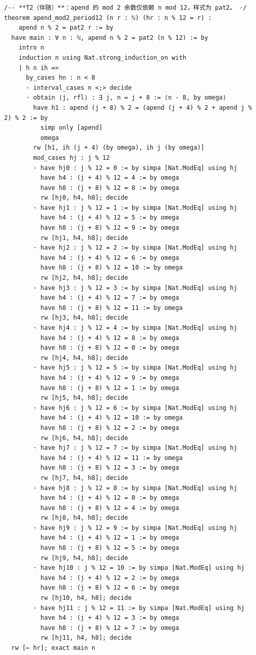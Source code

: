 \documentclass[11pt]{article}
\theoremstyle{definition}
\begin{document}
\begin{lstlisting}
/-- **T2（伴随）**：apend 的 mod 2 余数仅依赖 n mod 12，样式为 pat2。 -/
theorem apend_mod2_period12 (n r : ℕ) (hr : n % 12 = r) :
    apend n % 2 = pat2 r := by
  have main : ∀ n : ℕ, apend n % 2 = pat2 (n % 12) := by
    intro n
    induction n using Nat.strong_induction_on with
    | h n ih =>
      by_cases hn : n < 8
      · interval_cases n <;> decide
      · obtain ⟨j, rfl⟩ : ∃ j, n = j + 8 := ⟨n - 8, by omega⟩
        have h1 : apend (j + 8) % 2 = (apend (j + 4) % 2 + apend j % 2) % 2 := by
          simp only [apend]
          omega
        rw [h1, ih (j + 4) (by omega), ih j (by omega)]
        mod_cases hj : j % 12
        · have hj0 : j % 12 = 0 := by simpa [Nat.ModEq] using hj
          have h4 : (j + 4) % 12 = 4 := by omega
          have h8 : (j + 8) % 12 = 8 := by omega
          rw [hj0, h4, h8]; decide
        · have hj1 : j % 12 = 1 := by simpa [Nat.ModEq] using hj
          have h4 : (j + 4) % 12 = 5 := by omega
          have h8 : (j + 8) % 12 = 9 := by omega
          rw [hj1, h4, h8]; decide
        · have hj2 : j % 12 = 2 := by simpa [Nat.ModEq] using hj
          have h4 : (j + 4) % 12 = 6 := by omega
          have h8 : (j + 8) % 12 = 10 := by omega
          rw [hj2, h4, h8]; decide
        · have hj3 : j % 12 = 3 := by simpa [Nat.ModEq] using hj
          have h4 : (j + 4) % 12 = 7 := by omega
          have h8 : (j + 8) % 12 = 11 := by omega
          rw [hj3, h4, h8]; decide
        · have hj4 : j % 12 = 4 := by simpa [Nat.ModEq] using hj
          have h4 : (j + 4) % 12 = 8 := by omega
          have h8 : (j + 8) % 12 = 0 := by omega
          rw [hj4, h4, h8]; decide
        · have hj5 : j % 12 = 5 := by simpa [Nat.ModEq] using hj
          have h4 : (j + 4) % 12 = 9 := by omega
          have h8 : (j + 8) % 12 = 1 := by omega
          rw [hj5, h4, h8]; decide
        · have hj6 : j % 12 = 6 := by simpa [Nat.ModEq] using hj
          have h4 : (j + 4) % 12 = 10 := by omega
          have h8 : (j + 8) % 12 = 2 := by omega
          rw [hj6, h4, h8]; decide
        · have hj7 : j % 12 = 7 := by simpa [Nat.ModEq] using hj
          have h4 : (j + 4) % 12 = 11 := by omega
          have h8 : (j + 8) % 12 = 3 := by omega
          rw [hj7, h4, h8]; decide
        · have hj8 : j % 12 = 8 := by simpa [Nat.ModEq] using hj
          have h4 : (j + 4) % 12 = 0 := by omega
          have h8 : (j + 8) % 12 = 4 := by omega
          rw [hj8, h4, h8]; decide
        · have hj9 : j % 12 = 9 := by simpa [Nat.ModEq] using hj
          have h4 : (j + 4) % 12 = 1 := by omega
          have h8 : (j + 8) % 12 = 5 := by omega
          rw [hj9, h4, h8]; decide
        · have hj10 : j % 12 = 10 := by simpa [Nat.ModEq] using hj
          have h4 : (j + 4) % 12 = 2 := by omega
          have h8 : (j + 8) % 12 = 6 := by omega
          rw [hj10, h4, h8]; decide
        · have hj11 : j % 12 = 11 := by simpa [Nat.ModEq] using hj
          have h4 : (j + 4) % 12 = 3 := by omega
          have h8 : (j + 8) % 12 = 7 := by omega
          rw [hj11, h4, h8]; decide
  rw [← hr]; exact main n


\end{lstlisting}
\end{document}
